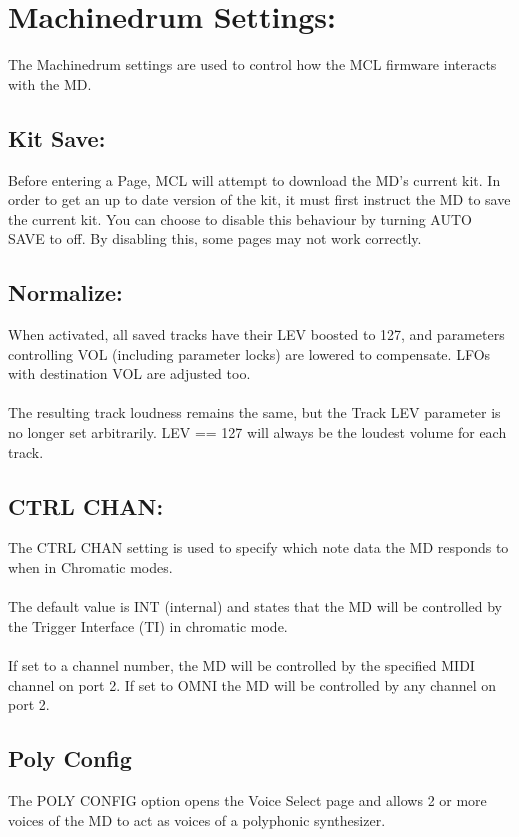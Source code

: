 \chapter{Machinedrum Settings:}
The Machinedrum settings are used to control how the MCL firmware interacts with the MD.
\\
\section{Kit Save:}
Before entering a Page, MCL will attempt to download the MD's current kit. In order to get an up to date version of the kit, it must first instruct the MD to save the current kit. You can choose to disable this behaviour by turning AUTO SAVE to off. By disabling this, some pages may not work correctly.
\section{Normalize:}
When activated, all saved tracks have their LEV boosted to 127, and parameters controlling VOL (including parameter locks) are lowered
to compensate. LFOs with destination VOL are 
adjusted too.\\
\\
The resulting track loudness remains the same, but the Track LEV parameter is no longer set arbitrarily. LEV == 127 will always be the loudest volume for each track.
\section{CTRL CHAN:}
The CTRL CHAN setting is used to specify which note data the MD responds to when in Chromatic modes. \\\\The default value is INT (internal) and states that the MD will be controlled by the Trigger Interface (TI) in chromatic mode. \\
\\If set to a channel number, the MD will be controlled by the specified MIDI channel on port 2. If set to OMNI the MD will be controlled by any channel on port 2.
\section{Poly Config}
The POLY CONFIG option opens the Voice Select page and allows 2 or more voices of the MD to act as voices of a polyphonic synthesizer.
